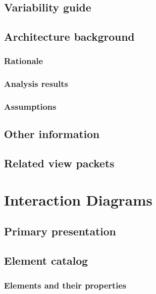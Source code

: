 \documentclass[a4paper,10pt]{paper}
\begin{document}
\subsection{Variability guide}

\subsection{Architecture background}

\subsubsection{Rationale}

\subsubsection{Analysis results}

\subsubsection{Assumptions}

\subsection{Other information}

\subsection{Related view packets}



\section{Interaction Diagrams}

\subsection{Primary presentation}

\subsection{Element catalog}

\subsubsection{Elements and their properties}
\end{document}

